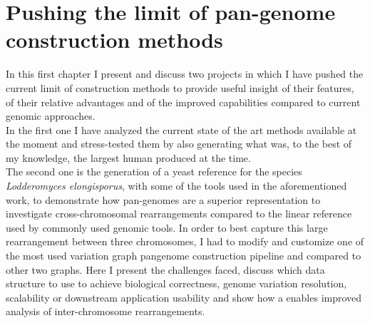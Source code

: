 \chapter{Pushing the limit of pan-genome construction methods}

\label{sec:pushing}
In this first chapter I present and discuss two projects in which I have pushed the current limit of \pangenome construction methods to provide useful insight of their features, of their relative advantages and of the improved capabilities compared to current genomic approaches.\\ In the first one I have analyzed the current state of the art methods available at the moment and stress-tested them by also generating what was, to the best of my knowledge, the largest human \pangenome produced at the time.\\ The second one is the generation of a yeast \pangenome reference for the species \emph{Lodderomyces elongisporus}, with some of the tools used in the aforementioned work, to demonstrate how pan-genomes are a superior representation to investigate cross-chromosomal rearrangements compared to the linear reference used by commonly used genomic tools. In order to best capture this large rearrangement between three chromosomes, I had to modify and customize one of the most used variation graph pangenome construction pipeline and compared to other two graphs. Here I present the challenges faced, discuss which data structure to use to achieve biological correctness, genome variation resolution, scalability or downstream application usability and show how a \pangenome enables improved analysis of inter-chromosome rearrangements.

